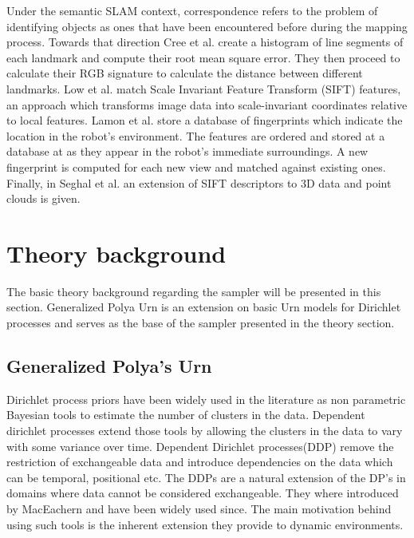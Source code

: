 \documentclass[]{article}
\begin{document}
Under the semantic SLAM context, correspondence refers to the problem of identifying objects as ones that have been encountered before during the mapping process. Towards that direction Cree et al.\cite{corresp:first} create a histogram of line segments of each landmark and compute their root mean square error. They then proceed to calculate their RGB signature to calculate the distance between different landmarks. Low et al.\cite{corres:sec} match Scale Invariant Feature Transform (SIFT) features, an approach which transforms image data into scale-invariant coordinates relative to local features. Lamon et al.\cite{corres:three} store a database of fingerprints which indicate the location in the robot's environment. The features are ordered and stored at a database at as they appear in the robot's immediate surroundings. A new fingerprint is computed for each new view and matched against existing ones. Finally, in Seghal et al.\cite{corres:four} an extension of SIFT descriptors to 3D data and point clouds is given.

\section{Theory background}
\label{sec:theory}

The basic theory background regarding the sampler will be presented in this section. Generalized Polya Urn is an extension on basic Urn\cite{caron} models for Dirichlet processes and serves as the base of the sampler presented in the theory section.

\subsection{Generalized Polya's Urn}

Dirichlet process priors have been widely used in the literature as non parametric Bayesian tools to estimate the number of clusters in the data\cite{antoniak}. Dependent dirichlet processes extend those tools by allowing the clusters in the data to vary with some variance over time. Dependent Dirichlet processes(DDP) remove the restriction of exchangeable data and introduce dependencies on the data which can be temporal, positional etc. The DDPs are a natural extension of the DP's in domains where data cannot be considered exchangeable. They where introduced by MacEachern\cite{theory:ddp} and have been widely used since. The main motivation behind using such tools is the inherent extension they provide to dynamic environments.
\end{document}
